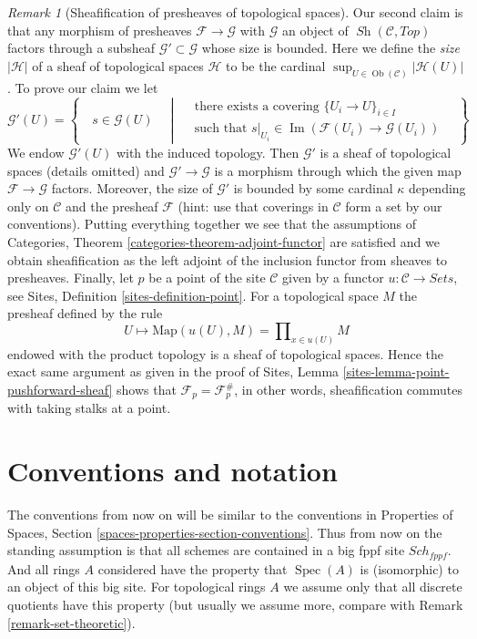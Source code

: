 \documentclass{stacks-project}
\theoremstyle{plain}
\theoremstyle{definition}
\theoremstyle{remark}
\newtheorem{remark}[subsection]{Remark}
\numberwithin{equation}{subsection}
\def\Spec{\mathop{\mathrm{Spec}}}
\def\Sch{\mathit{Sch}}
\def\Ob{\mathop{\mathrm{Ob}}\nolimits}
\def\Sh{\mathop{\mathit{Sh}}\nolimits}
\def\Im{\mathop{\mathrm{Im}}}
\begin{document}
\begin{remark}[Sheafification of presheaves of topological spaces]
Our second claim is that any morphism of presheaves
$\mathcal{F} \to \mathcal{G}$ with $\mathcal{G}$ an object of
$\Sh(\mathcal{C}, \textit{Top})$ factors through a subsheaf
$\mathcal{G}' \subset \mathcal{G}$ whose size is bounded.
Here we define the {\it size} $|\mathcal{H}|$
of a sheaf of topological spaces $\mathcal{H}$ to be the cardinal
$\sup_{U \in \Ob(\mathcal{C})} |\mathcal{H}(U)|$.
To prove our claim we let
$$
\mathcal{G}'(U) =
\left\{
\quad
s \in \mathcal{G}(U)
\quad \middle| \quad
\begin{matrix}
\text{there exists a covering }\{U_i \to U\}_{i \in I} \\
\text{such that }
s|_{U_i} \in \Im(\mathcal{F}(U_i) \to \mathcal{G}(U_i))
\end{matrix}
\quad
\right\}
$$
We endow $\mathcal{G}'(U)$ with the induced topology.
Then $\mathcal{G}'$ is a sheaf of topological spaces (details omitted)
and $\mathcal{G}' \to \mathcal{G}$ is a morphism through which
the given map $\mathcal{F} \to \mathcal{G}$ factors. Moreover,
the size of $\mathcal{G}'$ is bounded by some cardinal
$\kappa$ depending only on $\mathcal{C}$ and the presheaf $\mathcal{F}$
(hint: use that coverings in $\mathcal{C}$
form a set by our conventions). Putting everything together we see
that the assumptions of Categories, Theorem
\ref{categories-theorem-adjoint-functor}
are satisfied and we obtain sheafification as the left
adjoint of the inclusion functor from sheaves to presheaves.
Finally, let $p$ be a point of the
site $\mathcal{C}$ given by a functor $u : \mathcal{C} \to \textit{Sets}$,
see Sites, Definition \ref{sites-definition-point}.
For a topological space $M$ the presheaf defined by the rule
$$
U \mapsto \text{Map}(u(U), M) = \prod\nolimits_{x \in u(U)} M
$$
endowed with the product topology is a sheaf of topological spaces.
Hence the exact same argument as given in the proof of
Sites, Lemma \ref{sites-lemma-point-pushforward-sheaf} shows that
$\mathcal{F}_p = \mathcal{F}^\#_p$, in other words, sheafification
commutes with taking stalks at a point.
\end{remark}




\section{Conventions and notation}
\label{section-conventions}

\noindent
The conventions from now on will be similar to the conventions in
Properties of Spaces, Section \ref{spaces-properties-section-conventions}.
Thus from now on the standing assumption is that all schemes are contained
in a big fppf site $\Sch_{fppf}$. And all rings $A$ considered have the
property that $\Spec(A)$ is (isomorphic) to an object of this big site.
For topological rings $A$ we assume only that all discrete quotients have
this property (but usually we assume more, compare with
Remark \ref{remark-set-theoretic}).
\end{document}
